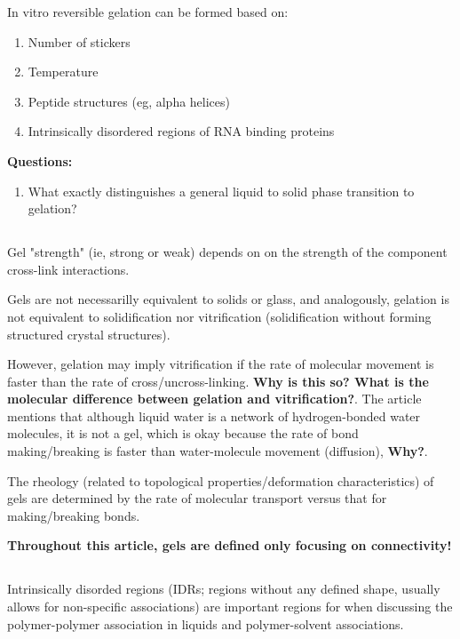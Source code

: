 \documentclass{article}
\begin{document}
In vitro reversible gelation can be formed based on:

\begin{enumerate}
    \item Number of stickers
    \item Temperature
    \item Peptide structures (eg, alpha helices)
    \item Intrinsically disordered regions of RNA binding proteins
\end{enumerate}

\textbf{Questions:}

\begin{enumerate}
    \item What exactly distinguishes a general liquid to solid phase transition to gelation?
\end{enumerate}

\subsection{}

Gel "strength" (ie, strong or weak) depends on on the strength of the component cross-link interactions.

Gels are not necessarilly equivalent to solids or glass, and analogously, gelation is not equivalent to solidification nor vitrification (solidification without forming structured crystal structures).

However, gelation may imply vitrification if the rate of molecular movement is faster than the rate of cross/uncross-linking. \textbf{Why is this so? What is the molecular difference between gelation and vitrification?}. The article mentions that although liquid water is a network of hydrogen-bonded water molecules, it is not a gel, which is okay because the rate of bond making/breaking is faster than water-molecule movement (diffusion), \textbf{Why?}.

The rheology (related to topological properties/deformation characteristics) of gels are determined by the rate of molecular transport versus that for making/breaking bonds.

\textbf{Throughout this article, gels are defined only focusing on connectivity!}

\subsection{}

Intrinsically disorded regions (IDRs; regions without any defined shape, usually allows for non-specific associations) are important regions for when discussing the polymer-polymer association in liquids and polymer-solvent associations.
\end{document}
